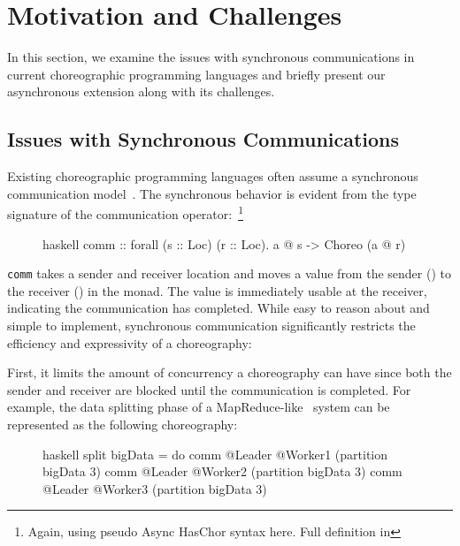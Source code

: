 \section{Motivation and Challenges}
\label{sec:motiv}

In this section, we examine the issues with synchronous communications in current choreographic programming languages and briefly present our asynchronous extension along with its challenges.

\subsection{Issues with Synchronous Communications}

Existing choreographic programming languages often assume a synchronous communication model~\citep{CC, chor-lambda, pirouette}.
%
The synchronous behavior is evident from the type signature of the communication operator:~\footnote{Again, using pseudo Async HasChor syntax here. Full definition in }

\begin{figure}[h]
\begin{cminted}{haskell}
comm :: forall (s :: Loc) (r :: Loc). a @ s -> Choreo (a @ r)
\end{cminted}
\end{figure}

\noindent \texttt{comm} takes a sender and receiver location and moves a value from the sender () to the receiver () in the  monad.
%
The value is immediately usable at the receiver, indicating the communication has completed.
%
While easy to reason about and simple to implement, synchronous communication significantly restricts the efficiency and expressivity of a choreography:

First, it limits the amount of concurrency a choreography can have since both the sender and receiver are blocked until the communication is completed.
%
For example, the data splitting phase of a MapReduce-like~\citep{map-reduce} system can be represented as the following choreography:

\begin{figure}[h]
\begin{cminted}{haskell}
split bigData = do
  comm @Leader @Worker1 (partition bigData 3)
  comm @Leader @Worker2 (partition bigData 3)
  comm @Leader @Worker3 (partition bigData 3)
\end{cminted}
\end{figure}

